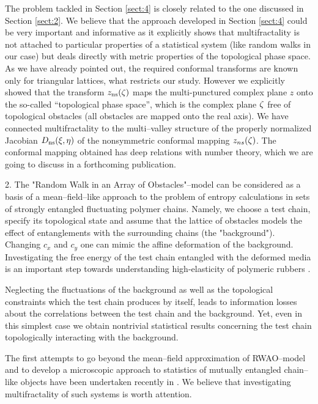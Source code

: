 The problem tackled in Section \ref{sect:4} is closely related to the one 
discussed in Section \ref{sect:2}. We believe that the 
approach developed in Section \ref{sect:4} could be very important and
informative as  it explicitly shows that  multifractality is not
attached to particular properties of a statistical system (like random walks in our case) but deals directly with  
metric properties of the   topological phase space. As we have already pointed out,  the required conformal transforms are known only for triangular lattices, what restricts our study. However we explicitly showed that the transform $z_{\rm ns}(\zeta)$ maps the multi-punctured complex plane $z$ onto the so-called ``topological phase space'', which is the complex plane $\zeta$ free of topological obstacles (all obstacles are mapped onto the real axis). We have connected multifractality to the multi--valley structure of the properly normalized
Jacobian $D_{\rm ns}(\xi,\eta)$ of the nonsymmetric conformal mapping
$z_{ns}(\zeta)$. The conformal mapping obtained has deep relations with number theory, which  we are going to discuss in a  forthcoming publication.

2. The "Random Walk in an Array of Obstacles"--model can be considered as a
basis of a mean--field--like approach to the problem of
entropy calculations in sets of strongly entangled fluctuating polymer
chains. Namely, we choose a  test chain, specify its topological state and assume
that the lattice of obstacles models the effect of entanglements with the
surrounding chains (the "background"). Changing $c_x$ and $c_y$ one can mimic
the affine deformation of the background. Investigating the free energy
of the test chain entangled with the deformed media is an important step towards understanding high-elasticity of polymeric rubbers \cite{khter}.

Neglecting the fluctuations of the background as well as the topological
constraints which the test chain produces by itself, leads to  information
 losses about the correlations between the test chain and the background. Yet, even in this simplest case we  obtain  nontrivial statistical results concerning the test chain topologically  interacting with the
background.


The first attempts to go beyond the mean--field approximation of
RWAO--model and to develop a  microscopic approach to statistics of mutually
entangled chain--like objects have been undertaken recently in
\cite{des_ver_never}. We believe that investigating multifractality of such
systems is worth attention.
\bigskip

